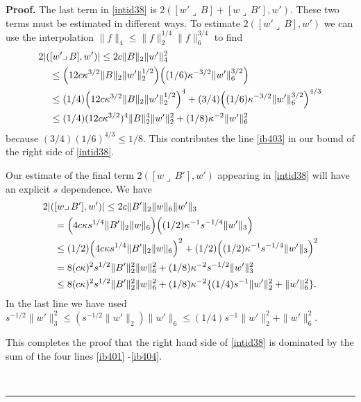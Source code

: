 \documentclass[12pt]{article}
\newenvironment{proof}[1][Proof]{\textbf{#1.} }{\ \rule{0.5em}{0.5em}}
\def \eref{\eqref}
\def \lrc{\lrcorner\,}
\numberwithin{equation}{section}
\begin{document}
\begin{proof}
The last term in \eref{intid38} is $2 ([w'\lrc B] + [w\lrc B'] , w')$.  These two terms must 
 be estimated in different ways.               
To estimate $2([w'\lrc B], w')$  we can use the interpolation 
           $\|f\|_4 \le \|f\|_2^{1/4} \|f\|_6^{3/4}$ to find 
 \begin{align}
2|( &[w'\lrc B], w')| \le 2c \|B\|_2 \|w'\|_4^2                                        \notag\\
&\le \Big(12c\kappa^{3/2} \|B\|_2 \|w'\|_2^{1/2}\Big) 
                       \Big( (1/6)\kappa^{-3/2} \|w'\|_6^{3/2}\Big)                  \notag\\
&\le  (1/4) \Big(12c\kappa^{3/2} \|B\|_2 \|w'\|_2^{1/2}\Big)^4 
               + (3/4) \Big((1/6)\kappa^{-3/2} \|w'\|_6^{3/2}\Big)^{4/3}       \notag\\
&\le (1/4)(12c\kappa^{3/2})^4 \|B\|_2^4 \|w'\|_2^2   + (1/8) \kappa^{-2} \|w'\|_6^2  \label{ib554b}
\end{align}
because $(3/4) (1/6)^{4/3} \le 1/8$. This contributes the line \eref{ib403} in
 our bound of the right side of \eref{intid38}.
 
 
Our estimate of the final term  $2( [w\lrc B'], w')$ appearing in \eref{intid38}
 will have  an explicit $s$ dependence.  We have
\begin{align}
2|(& [w\lrc B'], w')| \le 2c  \| B'\|_2\| w\|_6  \|w'\|_3                                     \notag\\
&= \Big(4c\kappa s^{1/4}\|B'\|_2\|w\|_6\Big)     
                \Big((1/2) \kappa^{-1} s^{-1/4}\| w'\|_3\Big)                             \notag\\
&\le (1/2)   \Big(4c\kappa s^{1/4} \|B'\|_2\|w\|_6 \Big)^2 
         +  (1/2) \Big((1/2) \kappa^{-1} s^{-1/4}\| w'\|_3\Big)^2                              \notag\\
& = 8(c\kappa)^2 s^{1/2} \| B'\|_2^2 \| w\|_6^2      
                              + (1/8) \kappa^{-2} s^{-1/2}\|w'\|_3^2                            \notag \\   
  & \le  8(c\kappa)^2 s^{1/2} \| B'\|_2^2 \| w\|_6^2 
  +  (1/8) \kappa^{-2} \{(1/4)s^{-1} \|w'\|_2^2 + \|w'\|_6^2\} .   \label{ib553a}
\end{align}
In the last line we have used $s^{-1/2} \|w'\|_3^2 \le (s^{-1/2} \|w'\|_2) \| w'\|_6
 \le (1/4)s^{-1}\|w'\|_2^2 + \|w'\|_6^2$.
 
      This completes the proof that the right hand side of \eref{intid38} is dominated by the sum
      of the four lines \eref{ib401} -\eref{ib404}.



\end{proof}
\end{document}
